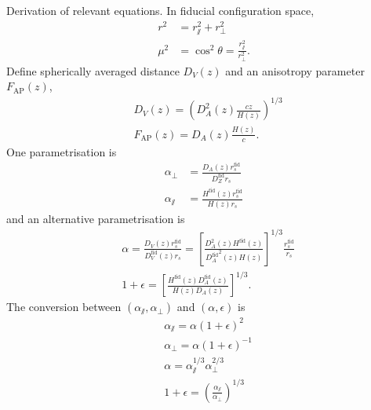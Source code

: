\documentclass[fleqn,usenatbib]{mnras}
\begin{document}
	Derivation of relevant equations. In fiducial configuration space, 
	\begin{align}
		r^2 	&= r_\varparallel ^2 + r_\perp ^2 \\
		\mu^2 	&= \cos^2 \theta = \frac{r_\varparallel ^2}{r_\perp ^2} .
	\end{align}
	Define spherically averaged distance $D_V(z)$ and an anisotropy parameter $F_\text{AP}(z)$, 
	\begin{align}
		& D_V(z) = \left( D_A^2 (z) \frac{cz}{H(z)} \right) ^{1/3}\\
		& F_\text{AP} (z) = D_A (z) \frac{H(z)}{c} .
	\end{align}
	One parametrisation is
	\begin{align}
		\alpha_\perp 		&= \frac{D_A(z) r_s ^\text{fid}}{D_Z^\text{fid} r_s} \\
		\alpha_\varparallel &= \frac{H^\text{fid}(z) r_s^\text{fid}}{H(z) r_s}
	\end{align}
	and an alternative parametrisation is
	\begin{align}
		& \alpha 	= \frac{D_V(z) r_s^\text{fid}}{D_V^\text{fid}(z) r_s}
				= \left[
						\frac{ D_A^2(z) H^\text{fid} (z) }
							 { {D_A^\text{fid}}^2 (z) H(z) }
					\right] ^{1/3} \frac{r_s^\text{fid}}{r_s} \\
		& 1 + \epsilon = \left[ \frac{ H^\text{fid}(z) D_A^\text{fid}(z) } { H(z) D_A(z) } \right] ^{1/3} .
	\end{align}
	The conversion between $(\alpha_\varparallel, \alpha_\perp)$ and $(\alpha, \epsilon)$ is
	\begin{align}
		& \alpha_\varparallel = \alpha (1+\epsilon) ^2 \\
		& \alpha_\perp = \alpha (1+\epsilon) ^{-1} \\
		& \alpha = \alpha_\varparallel ^{1/3} \alpha_\perp ^{2/3}\\
		& 1+\epsilon = \left( \frac{\alpha_\varparallel}{\alpha_\perp} \right) ^{1/3}
	\end{align}
	






\end{document}
